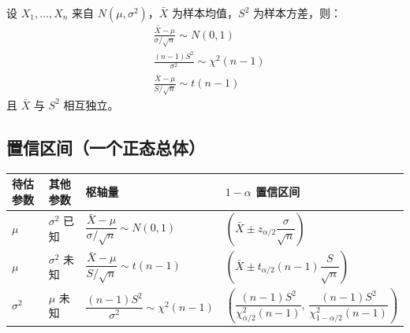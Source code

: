 \documentclass[12pt, a4paper]{article}
\begin{document}
\begin{tcolorbox}[thmbox, title={一个正态总体的抽样分布（必须记住）}]
    设 $X_1,\ldots,X_n$ 来自 $N(\mu,\sigma^2)$，$\bar{X}$ 为样本均值，$S^2$ 为样本方差，则：
    \begin{align}
         & \frac{\bar{X}-\mu}{\sigma/\sqrt{n}}\sim N(0,1) \\[6pt]
         & \frac{(n-1)S^2}{\sigma^2}\sim\chi^2(n-1)       \\[6pt]
         & \frac{\bar{X}-\mu}{S/\sqrt{n}}\sim t(n-1)
    \end{align}
    且 $\bar{X}$ 与 $S^2$ 相互独立。
\end{tcolorbox}

\subsection{置信区间（一个正态总体）}

\begin{center}
    \renewcommand{\arraystretch}{2}
    \begin{tabular}{llll}
        \toprule
        待估参数       & 其他参数                                                                                                 & 枢轴量                                               & $1-\alpha$ 置信区间 \\
        \midrule
        $\mu$      & $\sigma^2$ 已知                                                                                        & $\dfrac{\bar{X}-\mu}{\sigma/\sqrt{n}}\sim N(0,1)$
                   & $\left(\bar{X}\pm z_{\alpha/2}\dfrac{\sigma}{\sqrt{n}}\right)$                                                                                                             \\[8pt]
        $\mu$      & $\sigma^2$ 未知                                                                                        & $\dfrac{\bar{X}-\mu}{S/\sqrt{n}}\sim t(n-1)$
                   & $\left(\bar{X}\pm t_{\alpha/2}(n-1)\dfrac{S}{\sqrt{n}}\right)$                                                                                                             \\[8pt]
        $\sigma^2$ & $\mu$ 未知                                                                                             & $\dfrac{(n-1)S^2}{\sigma^2}\sim\chi^2(n-1)$
                   & $\left(\dfrac{(n-1)S^2}{\chi^2_{\alpha/2}(n-1)},\,\dfrac{(n-1)S^2}{\chi^2_{1-\alpha/2}(n-1)}\right)$                                                                       \\
        \bottomrule
    \end{tabular}
\end{center}
\end{document}
